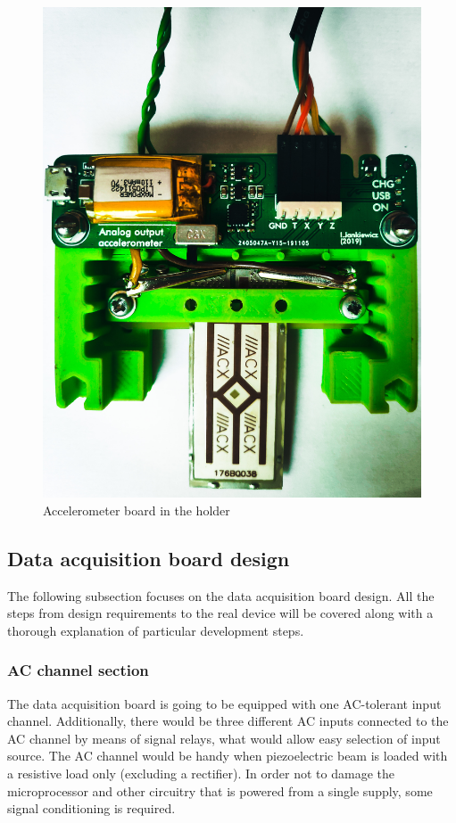 \documentclass[12pt,a4paper]{article}
\begin{document}
\begin{figure}[ht!]
\includegraphics[scale=0.1]{piezoboard.jpg}
\caption{Accelerometer board in the holder}
\label{fig:piezoboard}
\end{figure}

\par

\subsection{Data acquisition board design}

The following subsection focuses on the data acquisition board design. All the steps from design requirements to the real device will be covered along with a thorough explanation of particular development steps.

\subsubsection{AC channel section}
The data acquisition board is going to be equipped with one AC-tolerant input channel. Additionally, there would be three different AC inputs connected to the AC channel by means of signal relays, what would allow easy selection of input source. The AC channel would be handy when piezoelectric beam is loaded with a resistive load only (excluding a rectifier). In order not to damage the microprocessor and other circuitry that is powered from a single supply, some signal conditioning is required. 
\par
\end{document}

